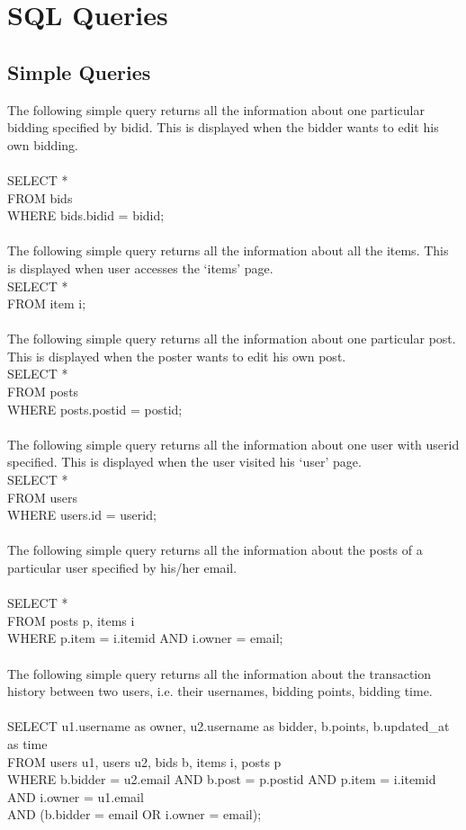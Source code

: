 \newpage

\section{SQL Queries}

\subsection{Simple Queries}

The following simple query returns all the information about one particular bidding specified by bidid. This is displayed when the bidder wants to edit his own bidding.\\
\\
SELECT * \\
FROM bids\\
WHERE bids.bidid = bidid;\\\\
The following simple query returns all the information about all the items. This is displayed when user accesses the `items' page.\\
SELECT * \\
FROM item i;\\\\
The following simple query returns all the information about one particular post. This is displayed when the poster wants to edit his own post.\\
SELECT * \\
FROM posts \\
WHERE posts.postid = postid;\\\\
The following simple query returns all the information about one user with userid specified. This is displayed when the user visited his `user' page.\\
SELECT * \\
FROM users \\
WHERE users.id = userid;\\\\
The following simple query returns all the information about the posts of a particular user specified by his/her email.\\\\
SELECT * \\
FROM posts p, items i \\
WHERE p.item = i.itemid AND i.owner = email;\\\\
The following simple query returns all the information about the transaction history between two users, i.e. their usernames, bidding points, bidding time.\\\\
SELECT u1.username as owner, u2.username as bidder, b.points, b.updated\_at as time\\
FROM users u1, users u2, bids b, items i, posts p\\
WHERE b.bidder = u2.email AND b.post = p.postid AND p.item = i.itemid AND i.owner = u1.email\\
AND (b.bidder = email OR i.owner = email);

